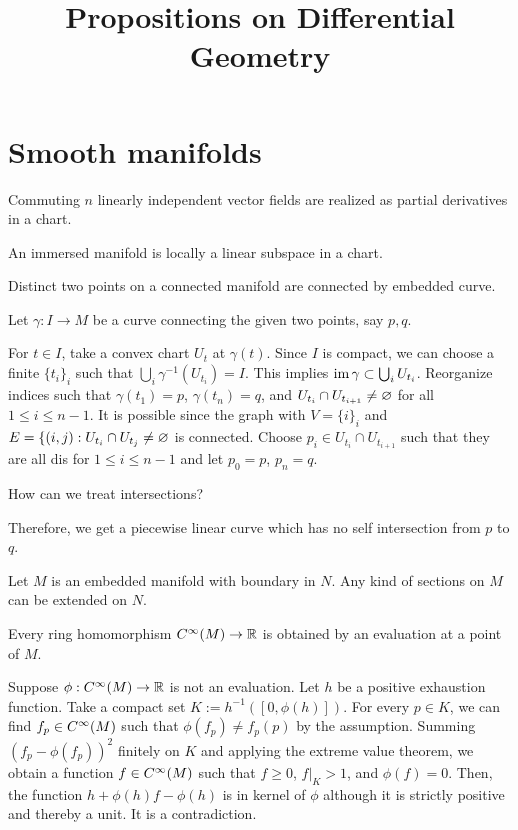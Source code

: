 \documentclass{../exp}
\title{Propositions on Differential Geometry}
\begin{document}
\maketitle
\tableofcontents


\section{Smooth manifolds}

\begin{prop}
Commuting $n$ linearly independent vector fields are realized as partial derivatives in a chart.
\end{prop}
\begin{prop}
An immersed manifold is locally a linear subspace in a chart.
\end{prop}

\begin{prop}
Distinct two points on a connected manifold are connected by embedded curve.
\end{prop}
\begin{pf}
Let $\gamma:I\to M$ be a curve connecting the given two points, say $p,q$.

For $t\in I$, take a convex chart $U_t$ at $\gamma(t)$.
Since $I$ is compact, we can choose a finite $\{t_i\}_i$ such that $\bigcup_i\gamma^{-1}(U_{t_i})=I$.
This implies $\operatorname{im}\gamma\subset\bigcup_iU_{t_i}$.
Reorganize indices such that $\gamma(t_1)=p$, $\gamma(t_n)=q$, and $U_{t_i}\cap U_{t_{i+1}}\ne\varnothing$ for all $1\le i\le n-1$.
It is possible since the graph with $V=\{i\}_i$ and $E=\{(i,j):U_{t_i}\cap U_{t_j}\ne\varnothing$ is connected.
Choose $p_i\in U_{t_i}\cap U_{t_{i+1}}$ such that they are all dis for $1\le i\le n-1$ and let $p_0=p$, $p_n=q$.

How can we treat intersections?

Therefore, we get a piecewise linear curve which has no self intersection from $p$ to $q$.

\end{pf}


\begin{prop}
Let $M$ is an embedded manifold with boundary in $N$.
Any kind of sections on $M$ can be extended on $N$.
\end{prop}



\begin{prop}
Every ring homomorphism $C^\oo(M)\to\R$ is obtained by an evaluation at a point of $M$.
\end{prop}
\begin{pf}
Suppose $\phi:C^\oo(M)\to\R$ is not an evaluation.
Let $h$ be a positive exhaustion function.
Take a compact set $K:=h^{-1}([0,\phi(h)])$.
For every $p\in K$, we can find $f_p\in C^\infty(M)$ such that $\phi(f_p)\ne f_p(p)$ by the assumption.
Summing $(f_p-\phi(f_p))^2$ finitely on $K$ and applying the extreme value theorem, we obtain a function $f\in C^\infty(M)$ such that $f\ge0$, $f|_K>1$, and $\phi(f)=0$.
Then, the function $h+\phi(h)f-\phi(h)$ is in kernel of $\phi$ although it is strictly positive and thereby a unit.
It is a contradiction.
\end{pf}
\end{document}
